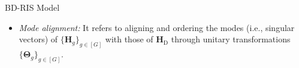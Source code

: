 \begin{section}{BD-RIS Model}
\begin{itemize}
		\item \emph{Mode alignment:} It refers to aligning and ordering the modes (i.e., singular vectors) of $\{\mathbf{H}_g\}_{g \in [G]}$ with those of $\mathbf{H}_\mathrm{D}$ through unitary transformations $\{\mathbf{\Theta}_g\}_{g \in [G]}$.

\end{itemize}
\end{section}
